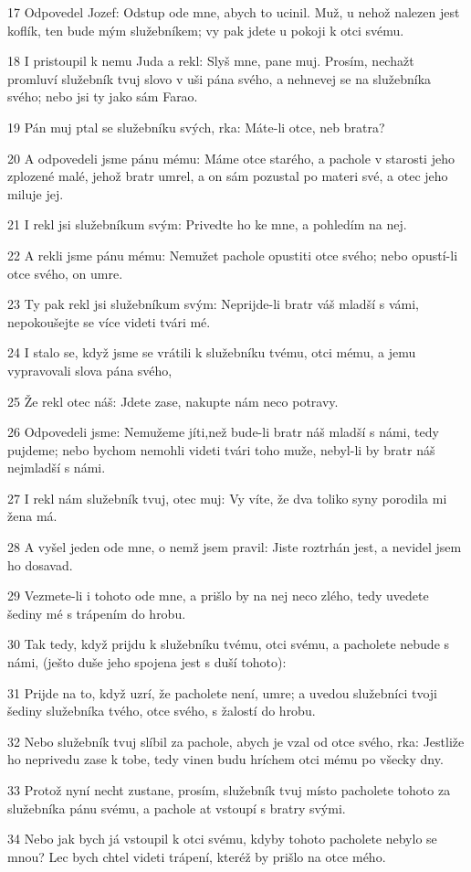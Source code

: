 \par 17 Odpovedel Jozef: Odstup ode mne, abych to ucinil. Muž, u nehož nalezen jest koflík, ten bude mým služebníkem; vy pak jdete u pokoji k otci svému.
\par 18 I pristoupil k nemu Juda a rekl: Slyš mne, pane muj. Prosím, nechažt promluví služebník tvuj slovo v uši pána svého, a nehnevej se na služebníka svého; nebo jsi ty jako sám Farao.
\par 19 Pán muj ptal se služebníku svých, rka: Máte-li otce, neb bratra?
\par 20 A odpovedeli jsme pánu mému: Máme otce starého, a pachole v starosti jeho zplozené malé, jehož bratr umrel, a on sám pozustal po materi své, a otec jeho miluje jej.
\par 21 I rekl jsi služebníkum svým: Privedte ho ke mne, a pohledím na nej.
\par 22 A rekli jsme pánu mému: Nemužet pachole opustiti otce svého; nebo opustí-li otce svého, on umre.
\par 23 Ty pak rekl jsi služebníkum svým: Neprijde-li bratr váš mladší s vámi, nepokoušejte se více videti tvári mé.
\par 24 I stalo se, když jsme se vrátili k služebníku tvému, otci mému, a jemu vypravovali slova pána svého,
\par 25 Že rekl otec náš: Jdete zase, nakupte nám neco potravy.
\par 26 Odpovedeli jsme: Nemužeme jíti,než bude-li bratr náš mladší s námi, tedy pujdeme; nebo bychom nemohli videti tvári toho muže, nebyl-li by bratr náš nejmladší s námi.
\par 27 I rekl nám služebník tvuj, otec muj: Vy víte, že dva toliko syny porodila mi žena má.
\par 28 A vyšel jeden ode mne, o nemž jsem pravil: Jiste roztrhán jest, a nevidel jsem ho dosavad.
\par 29 Vezmete-li i tohoto ode mne, a prišlo by na nej neco zlého, tedy uvedete šediny mé s trápením do hrobu.
\par 30 Tak tedy, když prijdu k služebníku tvému, otci svému, a pacholete nebude s námi, (ješto duše jeho spojena jest s duší tohoto):
\par 31 Prijde na to, když uzrí, že pacholete není, umre; a uvedou služebníci tvoji šediny služebníka tvého, otce svého, s žalostí do hrobu.
\par 32 Nebo služebník tvuj slíbil za pachole, abych je vzal od otce svého, rka: Jestliže ho neprivedu zase k tobe, tedy vinen budu hríchem otci mému po všecky dny.
\par 33 Protož nyní necht zustane, prosím, služebník tvuj místo pacholete tohoto za služebníka pánu svému, a pachole at vstoupí s bratry svými.
\par 34 Nebo jak bych já vstoupil k otci svému, kdyby tohoto pacholete nebylo se mnou? Lec bych chtel videti trápení, kteréž by prišlo na otce mého.

